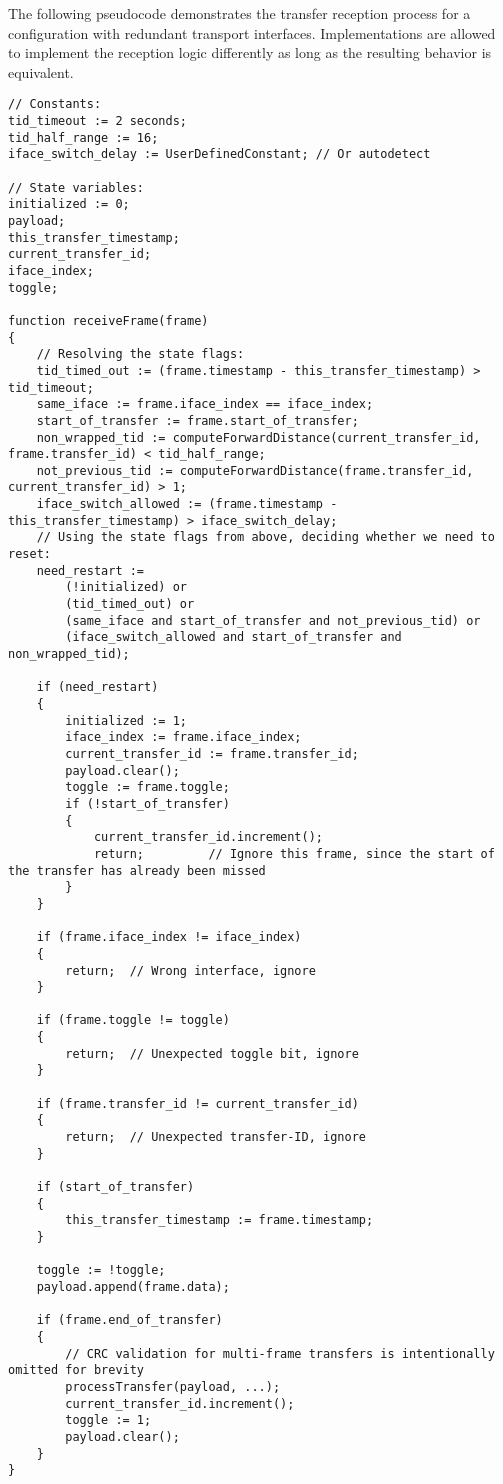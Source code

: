 The following pseudocode demonstrates the transfer reception process
for a configuration with redundant transport interfaces.
Implementations are allowed to implement the reception logic differently as long as the resulting
behavior is equivalent.

\clearpage
\begin{verbatim}
// Constants:
tid_timeout := 2 seconds;
tid_half_range := 16;
iface_switch_delay := UserDefinedConstant; // Or autodetect

// State variables:
initialized := 0;
payload;
this_transfer_timestamp;
current_transfer_id;
iface_index;
toggle;

function receiveFrame(frame)
{
    // Resolving the state flags:
    tid_timed_out := (frame.timestamp - this_transfer_timestamp) > tid_timeout;
    same_iface := frame.iface_index == iface_index;
    start_of_transfer := frame.start_of_transfer;
    non_wrapped_tid := computeForwardDistance(current_transfer_id, frame.transfer_id) < tid_half_range;
    not_previous_tid := computeForwardDistance(frame.transfer_id, current_transfer_id) > 1;
    iface_switch_allowed := (frame.timestamp - this_transfer_timestamp) > iface_switch_delay;
    // Using the state flags from above, deciding whether we need to reset:
    need_restart :=
        (!initialized) or
        (tid_timed_out) or
        (same_iface and start_of_transfer and not_previous_tid) or
        (iface_switch_allowed and start_of_transfer and non_wrapped_tid);

    if (need_restart)
    {
        initialized := 1;
        iface_index := frame.iface_index;
        current_transfer_id := frame.transfer_id;
        payload.clear();
        toggle := frame.toggle;
        if (!start_of_transfer)
        {
            current_transfer_id.increment();
            return;         // Ignore this frame, since the start of the transfer has already been missed
        }
    }

    if (frame.iface_index != iface_index)
    {
        return;  // Wrong interface, ignore
    }

    if (frame.toggle != toggle)
    {
        return;  // Unexpected toggle bit, ignore
    }

    if (frame.transfer_id != current_transfer_id)
    {
        return;  // Unexpected transfer-ID, ignore
    }

    if (start_of_transfer)
    {
        this_transfer_timestamp := frame.timestamp;
    }

    toggle := !toggle;
    payload.append(frame.data);

    if (frame.end_of_transfer)
    {
        // CRC validation for multi-frame transfers is intentionally omitted for brevity
        processTransfer(payload, ...);
        current_transfer_id.increment();
        toggle := 1;
        payload.clear();
    }
}
\end{verbatim}

